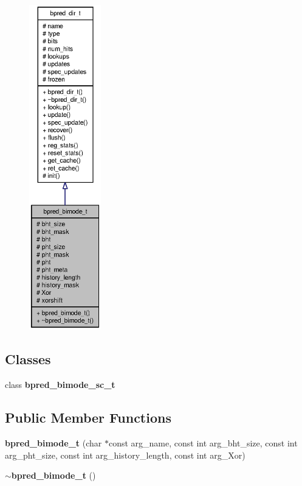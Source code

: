 \begin{figure}[H]
\begin{center}
\leavevmode
\includegraphics[height=400pt]{classbpred__bimode__t__coll__graph}
\end{center}
\end{figure}
\subsection*{Classes}
\begin{CompactItemize}
\item 
class {\bf bpred\_\-bimode\_\-sc\_\-t}
\end{CompactItemize}
\subsection*{Public Member Functions}
\begin{CompactItemize}
\item 
{\bf bpred\_\-bimode\_\-t} (char $\ast$const arg\_\-name, const int arg\_\-bht\_\-size, const int arg\_\-pht\_\-size, const int arg\_\-history\_\-length, const int arg\_\-Xor)
\item 
{\bf $\sim$bpred\_\-bimode\_\-t} ()
\end{CompactItemize}
